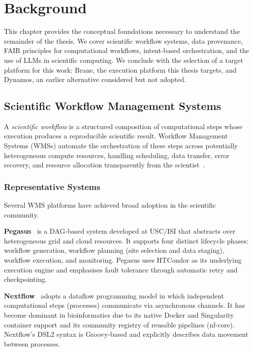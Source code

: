 \chapter{Background}\label{s:background}

This chapter provides the conceptual foundations necessary to understand the
remainder of the thesis. We cover scientific workflow systems, data provenance,
FAIR principles for computational workflows, intent-based orchestration, and the
use of LLMs in scientific computing. We conclude with the selection of a target
platform for this work: Brane, the execution platform this thesis targets, and
Dynamos, an earlier alternative considered but not adopted.

\section{Scientific Workflow Management Systems}

A \emph{scientific workflow} is a structured composition of computational steps
whose execution produces a reproducible scientific result. Workflow Management
Systems (WMSs) automate the orchestration of these steps across potentially
heterogeneous compute resources, handling scheduling, data transfer,
error recovery, and resource allocation transparently from the
scientist~\cite{deelman2015pegasus}.

\subsection{Representative Systems}

Several WMS platforms have achieved broad adoption in the scientific community.

\textbf{Pegasus}~\cite{deelman2015pegasus} is a DAG-based system developed at
USC/ISI that abstracts over heterogeneous grid and cloud resources. It supports
four distinct lifecycle phases: workflow generation, workflow planning
(site selection and data staging), workflow execution, and monitoring. Pegasus
uses HTCondor as its underlying execution engine and emphasises fault tolerance
through automatic retry and checkpointing.

\textbf{Nextflow}~\cite{di2017nextflow} adopts a dataflow programming model in
which independent computational steps (processes) communicate via asynchronous
channels. It has become dominant in bioinformatics due to its native Docker and
Singularity container support and its community registry of reusable pipelines
(nf-core). Nextflow's DSL2 syntax is Groovy-based and explicitly describes
data movement between processes.

